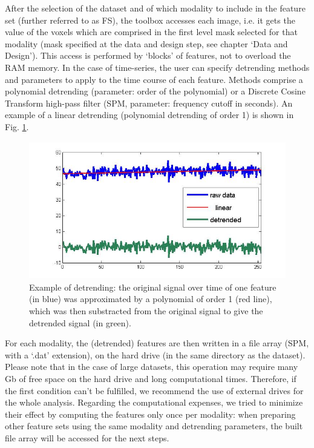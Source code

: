 After the selection of the dataset and of which modality to include in the feature set (further referred to as FS), the toolbox accesses each image, i.e. it gets the value of the voxels which are comprised in the first level mask selected for that modality (mask specified at the data and design step, see chapter `Data and Design'). 
This access is performed by `blocks' of features, not to overload the RAM memory. In the case of time-series, the user can specify detrending
methods and parameters to apply to the time course of each feature. Methods comprise a polynomial detrending (parameter: order of the polynomial) or
a Discrete Cosine Transform high-pass filter (SPM, parameter: frequency cutoff in seconds). An example of a linear detrending (polynomial detrending
of order 1) is shown in Fig. \ref{fig:lindetrend}.
\begin{figure}[!h]
  \begin{center}
      \includegraphics[height=6cm]{images/fig1_lindetrend.png}
   \caption{Example of detrending: the original signal over time of one feature (in blue) was approximated by a polynomial of order 1 (red line), which was then substracted from the original signal to give the detrended signal (in green).}
    \label{fig:lindetrend}
  \end{center}
\end{figure}

For each modality, the (detrended) features are then written in a file array (SPM, with a `.dat' extension), on the hard drive (in the same directory as the dataset). Please note that in the case of large datasets, this operation may require many Gb of free space on the hard drive and long computational times. Therefore, if the first condition can't be fulfilled, we recommend the use of external drives for the whole analysis. Regarding the computational expenses, we tried to minimize their effect by computing the features only once per modality: when preparing other feature sets using the same modality and detrending parameters, the built file array will be accessed for the next steps. 


